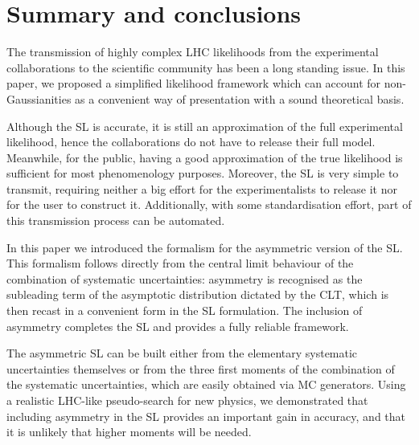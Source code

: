 \documentclass[11pt]{article}
\begin{document}
\section{Summary and conclusions}
\label{se:conclusions}


The transmission of highly complex LHC likelihoods from the experimental collaborations to the scientific community
has been a long standing issue. %
In this paper, we proposed a simplified likelihood framework which can account for non-Gaussianities as a convenient way of presentation 
with a sound theoretical basis. %

Although the SL is  accurate, it is still an approximation of the full experimental likelihood, hence the collaborations 
do not have to release their full %
model.
Meanwhile, for the public, having a good approximation of the true likelihood is sufficient for most phenomenology purposes. 
Moreover, the SL is very simple to transmit, requiring neither a big effort for the experimentalists to release it nor for the user to construct it. Additionally, with some standardisation effort, part of this transmission process can be automated. 

In this paper we introduced the formalism for the asymmetric version of the SL. 
This formalism follows directly from the central limit behaviour of the combination of systematic uncertainties: asymmetry is recognised as the subleading term of the asymptotic distribution dictated by the CLT, which is then recast in a convenient form in the SL formulation. 
The inclusion of asymmetry completes the SL and provides a fully reliable framework.

The asymmetric SL can be built either from the elementary systematic uncertainties themselves or from the three first moments  of the combination of the systematic uncertainties, which are easily obtained via MC generators. 
Using a realistic LHC-like pseudo-search for new physics, we demonstrated that including asymmetry in the SL provides  
an important gain in accuracy, and  that it is unlikely that higher moments will be needed.
\end{document}
